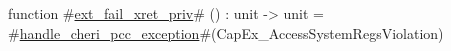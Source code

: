 function #\hyperref[sailRISCVzextzyfailzyxretzypriv]{ext\_fail\_xret\_priv}# () : unit -> unit =
  #\hyperref[sailRISCVzhandlezycherizypcczyexception]{handle\_cheri\_pcc\_exception}#(CapEx_AccessSystemRegsViolation)

